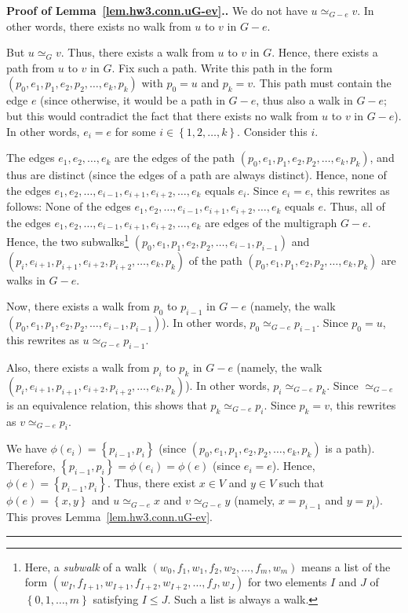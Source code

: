 \documentclass[numbers=enddot,12pt,final,onecolumn,notitlepage]{scrartcl}%
\theoremstyle{definition}
\newenvironment{proof}[1][Proof]{\noindent\textbf{#1.} }{\ \rule{0.5em}{0.5em}}
\newcommand{\set}[1]{\left\{ #1 \right\}}
\newcommand{\tup}[1]{\left( #1 \right)}
\begin{document}
\begin{proof}[Proof of Lemma~\ref{lem.hw3.conn.uG-ev}.]
We do not have $u \simeq_{G - e} v$.
In other words, there exists no walk from $u$ to $v$ in
$G - e$.

But $u \simeq_G v$.
Thus, there exists a walk from $u$ to $v$ in $G$.
Hence, there exists a path from $u$ to $v$ in $G$.
Fix such a path.
Write this path in the form
$\tup{p_0, e_1, p_1, e_2, p_2, \ldots, e_k, p_k}$ with
$p_0 = u$ and $p_k = v$.
This path must contain the edge $e$ (since otherwise, it would
be a path in $G - e$, thus also a walk in $G - e$; but this
would contradict the fact that
there exists no walk from $u$ to $v$ in $G - e$).
In other words, $e_i = e$ for some
$i \in \set{1, 2, \ldots, k}$.
Consider this $i$.

The edges $e_1, e_2, \ldots, e_k$ are the edges of the path
$\tup{p_0, e_1, p_1, e_2, p_2, \ldots, e_k, p_k}$, and thus are
distinct (since the edges of a path are always distinct).
Hence, none of the edges
$e_1, e_2, \ldots, e_{i-1}, e_{i+1}, e_{i+2}, \ldots, e_k$
equals $e_i$.
Since $e_i = e$, this rewrites as follows:
None of the edges
$e_1, e_2, \ldots, e_{i-1}, e_{i+1}, e_{i+2}, \ldots, e_k$
equals $e$.
Thus, all of the edges
$e_1, e_2, \ldots, e_{i-1}, e_{i+1}, e_{i+2}, \ldots, e_k$
are edges of the multigraph $G - e$.
Hence, the two
subwalks\footnote{Here, a \textit{subwalk} of a walk
  $\tup{w_0, f_1, w_1, f_2, w_2, \ldots, f_m, w_m}$ means a
  list of the form
  $\tup{w_I, f_{I+1}, w_{I+1}, f_{I+2}, w_{I+2}, \ldots, f_J, w_J}$
  for two elements $I$ and $J$ of $\set{0, 1, \ldots, m}$
  satisfying $I \leq J$.
  Such a list is always a walk.}
$\tup{p_0, e_1, p_1, e_2, p_2, \ldots, e_{i-1}, p_{i-1}}$
and
$\tup{p_i, e_{i+1}, p_{i+1}, e_{i+2}, p_{i+2}, \ldots, e_k, p_k}$
of the path
$\tup{p_0, e_1, p_1, e_2, p_2, \ldots, e_k, p_k}$
are walks in $G - e$.

Now, there exists a walk from $p_0$ to $p_{i-1}$ in $G - e$
(namely, the walk \newline
$\tup{p_0, e_1, p_1, e_2, p_2, \ldots, e_{i-1}, p_{i-1}}$).
In other words, $p_0 \simeq_{G - e} p_{i-1}$.
Since $p_0 = u$, this rewrites as $u \simeq_{G - e} p_{i-1}$.

Also, there exists a walk from $p_i$ to $p_k$ in $G - e$
(namely, the walk \newline
$\tup{p_i, e_{i+1}, p_{i+1}, e_{i+2}, p_{i+2}, \ldots, e_k, p_k}$).
In other words, $p_i \simeq_{G - e} p_k$.
Since $\simeq_{G - e}$ is an equivalence relation, this shows
that $p_k \simeq_{G - e} p_i$.
Since $p_k = v$, this rewrites as $v \simeq_{G - e} p_i$.

We have $\phi\tup{e_i} = \set{p_{i-1}, p_i}$ (since
$\tup{p_0, e_1, p_1, e_2, p_2, \ldots, e_k, p_k}$ is a path).
Therefore, $\set{p_{i-1}, p_i} = \phi\tup{e_i} = \phi\tup{e}$
(since $e_i = e$). Hence,
$\phi\tup{e} = \set{p_{i-1}, p_i}$.
Thus, there exist $x \in V$ and $y \in V$ such that
$\phi\tup{e} = \set{x, y}$ and $u \simeq_{G - e} x$ and
$v \simeq_{G - e} y$ (namely, $x = p_{i-1}$ and $y = p_i$).
This proves Lemma~\ref{lem.hw3.conn.uG-ev}.
\end{proof}
\end{document}
